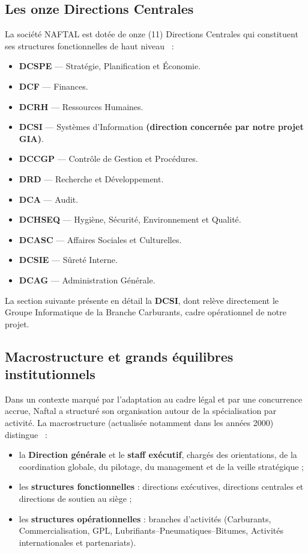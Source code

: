\subsection*{Les onze Directions Centrales}
La société NAFTAL est dotée de onze (11) Directions Centrales qui constituent
ses structures fonctionnelles de haut niveau~\cite{ingrachen2016} :

\begin{itemize}
    \item \textbf{DCSPE} — Stratégie, Planification et Économie.
    \item \textbf{DCF} — Finances.
    \item \textbf{DCRH} — Ressources Humaines.
    \item \textbf{DCSI} — Systèmes d'Information \textbf{(direction concernée
    par notre projet GIA)}.
    \item \textbf{DCCGP} — Contrôle de Gestion et Procédures.
    \item \textbf{DRD} — Recherche et Développement.
    \item \textbf{DCA} — Audit.
    \item \textbf{DCHSEQ} — Hygiène, Sécurité, Environnement et Qualité.
    \item \textbf{DCASC} — Affaires Sociales et Culturelles.
    \item \textbf{DCSIE} — Sûreté Interne.
    \item \textbf{DCAG} — Administration Générale.
\end{itemize}

La section suivante présente en détail la \textbf{DCSI}, dont relève directement le Groupe
Informatique de la Branche Carburants, cadre opérationnel de notre projet.

\subsection{Macrostructure et grands équilibres institutionnels}
Dans un contexte marqué par l'adaptation au cadre légal et par une concurrence accrue, Naftal
a structuré son organisation autour de la spécialisation par activité. La macrostructure
(actualisée notamment dans les années 2000) distingue~\cite{meghari2014} :
\begin{itemize}
    \item la \textbf{Direction générale} et le \textbf{staff exécutif}, chargés des orientations,
    de la coordination globale, du pilotage, du management et de la veille stratégique ;
    \item les \textbf{structures fonctionnelles} : directions exécutives, directions centrales
    et directions de soutien au siège ;
    \item les \textbf{structures opérationnelles} : branches d'activités (Carburants,
    Commercialisation, GPL, Lubrifiants--Pneumatiques--Bitumes, Activités internationales et
    partenariats).
\end{itemize}


